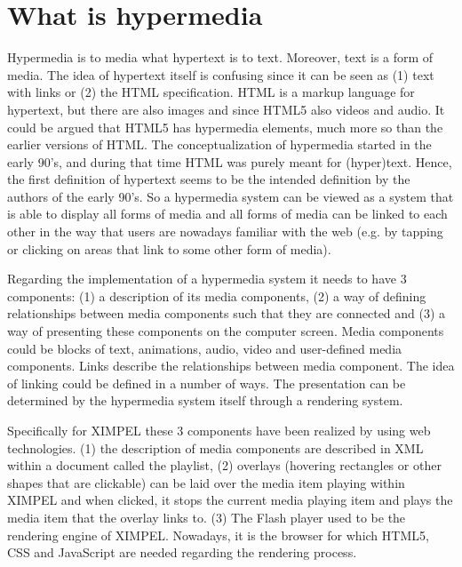 \section{What is hypermedia}
Hypermedia is to media what hypertext is to text. Moreover, text is a form of media. The idea of hypertext itself is confusing since it can be seen as (1) text with links or (2) the HTML specification. HTML is a markup language for hypertext, but there are also images and since HTML5 also videos and audio. It could be argued that HTML5 has hypermedia elements, much more so than the earlier versions of HTML. The conceptualization of hypermedia started in the early 90's, and during that time HTML was purely meant for (hyper)text\cite{html1}. Hence, the first definition of hypertext seems to be the intended definition by the authors of the early 90's. So a hypermedia system can be viewed as a system that is able to display all forms of media and all forms of media can be linked to each other in the way that users are nowadays familiar with the web (e.g. by tapping or clicking on areas that link to some other form of media).

Regarding the implementation of a hypermedia system it needs to have 3 components: (1) a description of its media components, (2) a way of defining relationships between media components such that they are connected and (3) a way of presenting these components on the computer screen. Media components could be blocks of text, animations, audio, video and user-defined media components. Links describe the relationships between media component. The idea of linking could be defined in a number of ways. The presentation can be determined by the hypermedia system itself through a rendering system. 

Specifically for XIMPEL these 3 components have been realized by using web technologies. (1) the description of media components are described in XML within a document called the playlist, (2) overlays (hovering rectangles or other shapes that are clickable) can be laid over the media item playing within XIMPEL and when clicked, it stops the current media playing item and plays the media item that the overlay links to. (3) The Flash player used to be the rendering engine of XIMPEL. Nowadays, it is the browser for which HTML5, CSS and JavaScript are needed regarding the rendering process.


